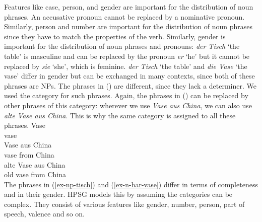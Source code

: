 \noindent
Features like case, person, and gender are important for the distribution of noun
phrases. An accusative pronoun cannot be replaced by a nominative pronoun. Similarly, person and
number are important for the distribution of noun phrases since they have to match the properties of
the verb. Similarly, gender is important for the distribution of noun phrases and pronouns:
\emph{der Tisch} `the table' is masculine and can be replaced by the pronoun \emph{er} `he' but it
cannot be replaced by \emph{sie} `she', which is feminine. \emph{der Tisch} `the table' and
\emph{die Vase} `the vase' differ in gender but can be exchanged in many contexts, since both of
these phrases are NPs. The phrases in () are different, since they lack a
determiner. We used the category \nbar for such phrases. Again, the phrases in () can be
replaced by other phrases of this category: wherever we use \emph{Vase aus China}, we can also use
\emph{alte Vase aus China}. This is why the same category is assigned to all these phrases.
\eal
\label{ex-n-bar-vase}
\ex 
\gll Vase\\
     vase\\
\ex 
\gll Vase aus China\\
     vase from China\\
\ex 
\gll alte Vase aus China\\
     old  vase from China\\
\zl
The phrases in (\ref{ex-np-tisch}) and (\ref{ex-n-bar-vase}) differ in terms of completeness and in
their gender. HPSG models this by assuming the categories can be complex. They consist of various
features like gender, number, person, part of speech, valence and so on.

